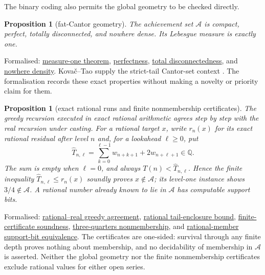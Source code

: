 \documentclass[11pt]{article}
\newcommand{\commit}{ebc98ee71f6819bd9fe344a0bb343542c604e533}
\newcommand{\repobase}{https://github.com/wcook04/plectis-lean-erdos249-257/blob/\commit}
\newcommand{\PK}{Erdos249257}
\newcommand{\lword}[4]{\href{\repobase/\PK/#1\#L#2}{#4}}
\newtheorem{proposition}[theorem]{Proposition}
\theoremstyle{definition}
\theoremstyle{remark}
\newcommand{\Q}{\mathbb{Q}}
\begin{document}
The binary coding also permits the global geometry to be checked directly.

\begin{proposition}[fat-Cantor geometry]\label{res:greedytopology}
The achievement set $\mathcal A$ is compact, perfect, totally disconnected,
and nowhere dense.  Its Lebesgue measure is exactly one.
\end{proposition}
\noindent Formalised:
\lword{GreedyAchievementSet.lean}{996}{volume_mersenneAchievementSet}{measure-one theorem},
\lword{GreedyAchievementSet.lean}{1620}{perfect_mersenneAchievementSet}{perfectness},
\lword{GreedyAchievementSet.lean}{1636}{isTotallyDisconnected_mersenneAchievementSet}{total disconnectedness},
and
\lword{GreedyAchievementSet.lean}{1645}{isNowhereDense_mersenneAchievementSet}{nowhere density}.
Kova\v{c}--Tao supply the strict-tail Cantor-set context
\cite[Remark~4.1]{kovactao}.  The
formalisation records these exact properties without making a novelty or
priority claim for them.

\begin{proposition}[exact rational runs and finite nonmembership certificates]\label{res:death}
The greedy recursion executed in exact rational arithmetic agrees step by step
with the real recursion under casting. For a rational target $x$, write
$r_n(x)$ for its exact rational residual after level $n$ and, for a lookahead
$\ell\ge0$, put
\[
\widehat T_{n,\ell}
  =\sum_{k=0}^{\ell-1}w_{n+k+1}+2w_{n+\ell+1}\in\Q .
\]
The sum is empty when $\ell=0$, and always
$T(n)<\widehat T_{n,\ell}$. Hence the finite inequality
$\widehat T_{n,\ell}\le r_n(x)$ soundly proves $x\notin\mathcal A$; its
level-one instance shows $3/4\notin\mathcal A$. A rational number already
known to lie in $\mathcal A$ has computable support bits.
\end{proposition}
\noindent Formalised:
\lword{GreedyAchievementSet.lean}{1130}{cast_greedyMersenneRemainderRat}{rational--real greedy agreement},
\lword{GreedyAchievementSet.lean}{1692}{mersenneTail_lt_cast_tailUpperRat}{rational tail-enclosure bound},
\lword{GreedyAchievementSet.lean}{1726}{certifiedGreedyMersenneDeath_not_mem}{finite-certificate soundness},
\lword{GreedyAchievementSet.lean}{1748}{three_fourths_not_mem_mersenneAchievementSet}{three-quarters nonmembership},
and \lword{GreedyAchievementSet.lean}{1832}{rational_member_support_bit_iff}{rational-member support-bit equivalence}.
The certificates are one-sided: survival through any finite depth proves
nothing about membership, and no decidability of membership in $\mathcal A$ is
asserted.  Neither the global geometry nor the finite nonmembership certificates
exclude rational values for either open series.
\end{document}
